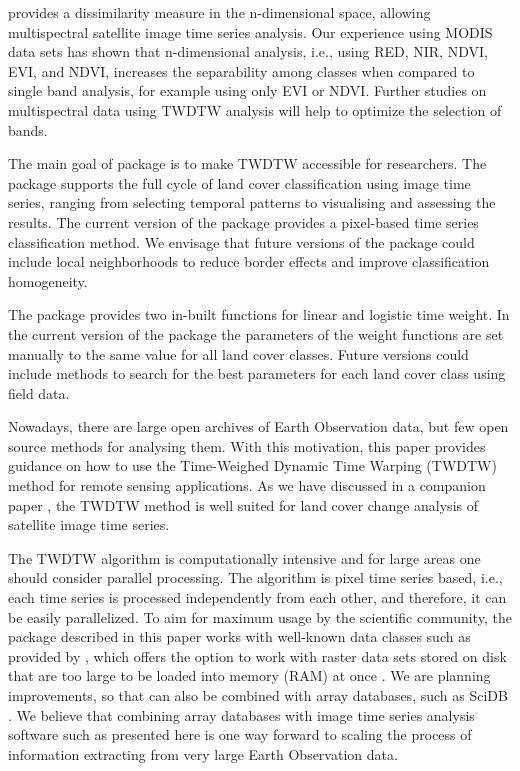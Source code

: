 \documentclass[article,shortnames]{jss}
\begin{document}
 provides a dissimilarity measure in the n-dimensional
space, allowing multispectral satellite image time series analysis. Our
experience using MODIS data sets has shown that n-dimensional analysis,
i.e., using RED, NIR, NDVI, EVI, and NDVI, increases the separability
among classes when compared to single band analysis, for example using
only EVI or NDVI. Further studies on multispectral data using TWDTW
analysis will help to optimize the selection of bands.

The main goal of  package is to make TWDTW accessible for
researchers. The package supports the full cycle of land cover
classification using image time series, ranging from selecting temporal
patterns to visualising and assessing the results. The current version
of the  package provides a pixel-based time series
classification method. We envisage that future versions of the package
could include local neighborhoods to reduce border effects and improve
classification homogeneity.

The  package provides two in-built functions for linear and
logistic time weight. In the current version of the package the
parameters of the weight functions are set manually to the same value
for all land cover classes. Future versions could include methods to
search for the best parameters for each land cover class using field
data.

Nowadays, there are large open archives of Earth Observation data, but
few open source methods for analysing them. With this motivation, this
paper provides guidance on how to use the Time-Weighed Dynamic Time
Warping (TWDTW) method for remote sensing applications. As we have
discussed in a companion paper \citep{Maus:2016}, the TWDTW method is
well suited for land cover change analysis of satellite image time
series.

The TWDTW algorithm is computationally intensive and for large areas one
should consider parallel processing. The algorithm is pixel time series
based, i.e., each time series is processed independently from each
other, and therefore, it can be easily parallelized. To aim for maximum
usage by the scientific community, the  package described in
this paper works with well-known  data classes such as
provided by , which offers the option to work with raster
data sets stored on disk that are too large to be loaded into memory
(RAM) at once \citep{Hijmans:2015}. We are planning improvements, so
that  can also be combined with array databases, such as
SciDB \citep{Stonebraker:2013}. We believe that combining array
databases with image time series analysis software such as presented
here is one way forward to scaling the process of information extracting
from very large Earth Observation data.
\end{document}
